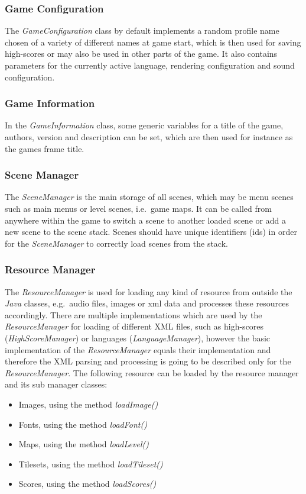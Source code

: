\subsubsection{Game Configuration}\label{subsubsec:game-configuration}
The \textit{GameConfiguration} class by default implements a random profile name chosen of a variety of different names at game start, which is then used for saving high-scores
or may also be used in other parts of the game.
It also contains parameters for the currently active language, rendering configuration and sound configuration.

\subsubsection{Game Information}\label{subsubsec:game-information}
In the \textit{GameInformation} class, some generic variables for a title of the game, authors, version and description can be set, which are then used for instance as the games frame
title.

\subsubsection{Scene Manager}\label{subsubsec:scene-manager}
The \textit{SceneManager} is the main storage of all scenes, which may be menu scenes such as main menus or level scenes, i.e.\ game maps.
It can be called from anywhere within the game to switch a scene to another loaded scene or add a new scene to the scene stack.
Scenes should have unique identifiers (ids) in order for the \textit{SceneManager} to correctly load scenes from the stack.
\subsubsection{Resource Manager}\label{subsubsec:resource-manager}
The \textit{ResourceManager} is used for loading any kind of resource from outside the \textit{Java} classes, e.g.\ audio files, images or xml data and processes
these resources accordingly.
There are multiple implementations which are used by the \textit{ResourceManager} for loading of different XML files,
such as high-scores (\textit{HighScoreManager}) or languages (\textit{LanguageManager}),
however the basic implementation of the \textit{ResourceManager} equals their implementation and therefore the XML
parsing and processing is going to be described only for the \textit{ResourceManager}.
The following resource can be loaded by the resource manager and its sub manager classes:
\begin{itemize}
    \item Images, using the method \textit{loadImage()}
    \item Fonts, using the method \textit{loadFont()}
    \item Maps, using the method \textit{loadLevel()}
    \item Tilesets, using the method \textit{loadTileset()}
    \item Scores, using the method \textit{loadScores()}
\end{itemize}
